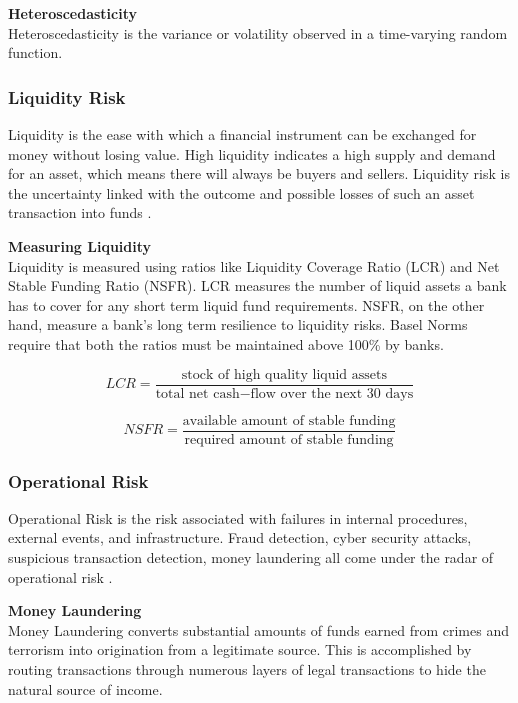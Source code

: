 \documentclass[a4paper, 12pt]{article}
\begin{document}
\vskip 0.2in
\noindent\textbf{Heteroscedasticity} \\
\noindent Heteroscedasticity is the variance or volatility observed in a time-varying random function.

\vskip 0.2in
\subsubsection{Liquidity Risk}
\noindent Liquidity is the ease with which a financial instrument can be exchanged for money without losing value. High liquidity indicates a high supply and demand for an asset, which means there will always be buyers and sellers. Liquidity risk is the uncertainty linked with the outcome and possible losses of such an asset transaction into funds \cite{tavana2018artificial}.

\vskip 0.2in
\noindent\textbf{Measuring Liquidity} \\
\noindent Liquidity is measured using ratios like Liquidity Coverage Ratio (LCR) and Net Stable Funding Ratio (NSFR). LCR measures the number of liquid assets a bank has to cover for any short term liquid fund requirements. NSFR, on the other hand, measure a bank's long term resilience to liquidity risks. Basel Norms require that both the ratios must be maintained above 100\% by banks.

\begin{equation}
    LCR = \frac{\text{stock of high quality liquid assets}}{\text{total net cash} - \text{flow over the next 30 days}}
\end{equation}

\begin{equation}
    NSFR = \frac{\text{available amount of stable funding}}{\text{required amount of stable funding}}
\end{equation}

\vskip 0.2in
\subsubsection{Operational Risk}
\noindent Operational Risk is the risk associated with failures in internal procedures, external events, and infrastructure. Fraud detection, cyber security attacks, suspicious transaction detection, money laundering all come under the radar of operational risk \cite{bessis2011risk}.

\vskip 0.2in
\noindent\textbf{Money Laundering} \\
\noindent Money Laundering converts substantial amounts of funds earned from crimes and terrorism into origination from a legitimate source. This is accomplished by routing transactions through numerous layers of legal transactions to hide the natural source of income.
\end{document}
